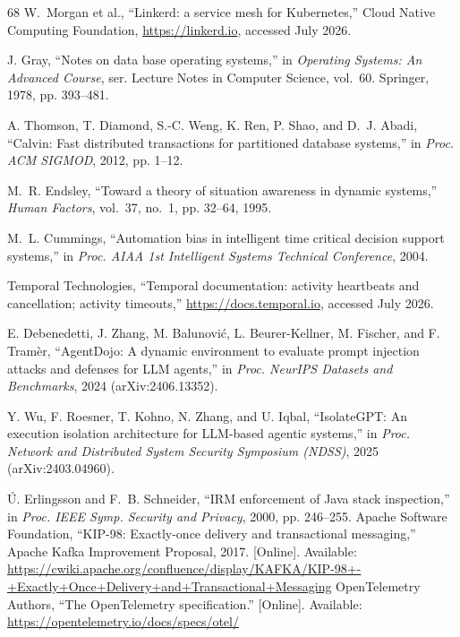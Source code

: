 \documentclass[10pt,journal,compsoc]{IEEEtran}
\begin{document}
\begin{thebibliography}{68}
 W.~Morgan et al., ``Linkerd: a service mesh for Kubernetes,''
Cloud Native Computing Foundation, \url{https://linkerd.io}, accessed July 2026.

 J. Gray, ``Notes on data base operating systems,'' in
\emph{Operating Systems: An Advanced Course}, ser. Lecture Notes in Computer
Science, vol.~60. Springer, 1978, pp. 393--481.

 A. Thomson, T. Diamond, S.-C. Weng, K. Ren, P. Shao, and
D.~J. Abadi, ``Calvin: Fast distributed transactions for partitioned database
systems,'' in \emph{Proc. ACM SIGMOD}, 2012, pp. 1--12.

 M.~R. Endsley, ``Toward a theory of situation awareness in
dynamic systems,'' \emph{Human Factors}, vol.~37, no.~1, pp. 32--64, 1995.

 M.~L. Cummings, ``Automation bias in intelligent time
critical decision support systems,'' in \emph{Proc. AIAA 1st Intelligent
Systems Technical Conference}, 2004.

 Temporal Technologies, ``Temporal documentation:
activity heartbeats and cancellation; activity timeouts,''
\url{https://docs.temporal.io}, accessed July 2026.

 E. Debenedetti, J. Zhang, M. Balunovi\'{c}, L. Beurer-Kellner,
M. Fischer, and F. Tram\`{e}r, ``AgentDojo: A dynamic environment to evaluate
prompt injection attacks and defenses for LLM agents,'' in \emph{Proc. NeurIPS
Datasets and Benchmarks}, 2024 (arXiv:2406.13352).

 Y. Wu, F. Roesner, T. Kohno, N. Zhang, and U. Iqbal,
``IsolateGPT: An execution isolation architecture for LLM-based agentic
systems,'' in \emph{Proc. Network and Distributed System Security Symposium
(NDSS)}, 2025 (arXiv:2403.04960).

 \'{U}. Erlingsson and F.~B. Schneider, ``IRM
enforcement of Java stack inspection,'' in \emph{Proc. IEEE Symp. Security
and Privacy}, 2000, pp. 246--255.
 Apache Software Foundation, ``KIP-98: Exactly-once
delivery and transactional messaging,'' Apache Kafka Improvement Proposal,
2017. [Online]. Available:
\url{https://cwiki.apache.org/confluence/display/KAFKA/KIP-98+-+Exactly+Once+Delivery+and+Transactional+Messaging}
 OpenTelemetry Authors, ``The OpenTelemetry specification.''
[Online]. Available: \url{https://opentelemetry.io/docs/specs/otel/}
\end{thebibliography}
\end{document}
